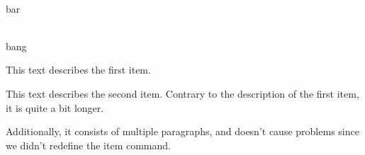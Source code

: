 \documentclass[a4paper]{article}
\newcommand{\seturdulabel}[1]{\item[\RLE{\notourdu #1}]\hfill\\}
\begin{document}
\baskerville
\begin{description}[style=nextline]
\seturdulabel{اردو}
bar
\item[baz]\hfill\\
bang
\end{description}

\renewcommand{\descriptionlabel}[1]{\hspace{\labelsep}\RLE{\large\notourdu #1}}
\begin{description}[leftmargin=12pt]
\item[دیپک جوئس]
This text describes the first item.
\item[رو]
This text describes the second item.
Contrary to the description of the first item, it is quite a bit longer.

Additionally, it consists of multiple paragraphs, and doesn't cause problems
since we didn't redefine the item command.
\end{description}
\end{document}
